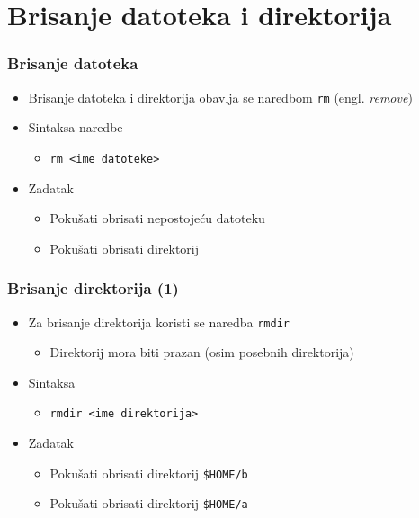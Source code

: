 \documentclass{beamer}
\begin{document}
\section{Brisanje datoteka i direktorija}
\begin{frame}[t]
\frametitle{Brisanje datoteka}
\begin{itemize}
  \item Brisanje datoteka i direktorija obavlja se naredbom \texttt{rm}
        (engl. \emph{remove})
  \item Sintaksa naredbe
  \begin{itemize}
    \item[] \texttt{rm \textless ime datoteke\textgreater}
  \end{itemize}
  \item Zadatak
  \begin{itemize}
    \item Pokušati obrisati nepostojeću datoteku
    \item Pokušati obrisati direktorij
  \end{itemize}
\end{itemize}
\end{frame}

\begin{frame}[t]
\frametitle{Brisanje direktorija (1)}
\begin{itemize}
  \item Za brisanje direktorija koristi se naredba \texttt{rmdir}
  \begin{itemize}
    \item Direktorij mora biti prazan (osim posebnih direktorija)
  \end{itemize}
  \item Sintaksa
  \begin{itemize}
    \item[] \texttt{rmdir \textless ime direktorija\textgreater}
  \end{itemize}
  \item Zadatak
  \begin{itemize}
    \item Pokušati obrisati direktorij \texttt{\$HOME/b}
    \item Pokušati obrisati direktorij \texttt{\$HOME/a}
  \end{itemize}
\end{itemize}
\end{frame}
\end{document}
